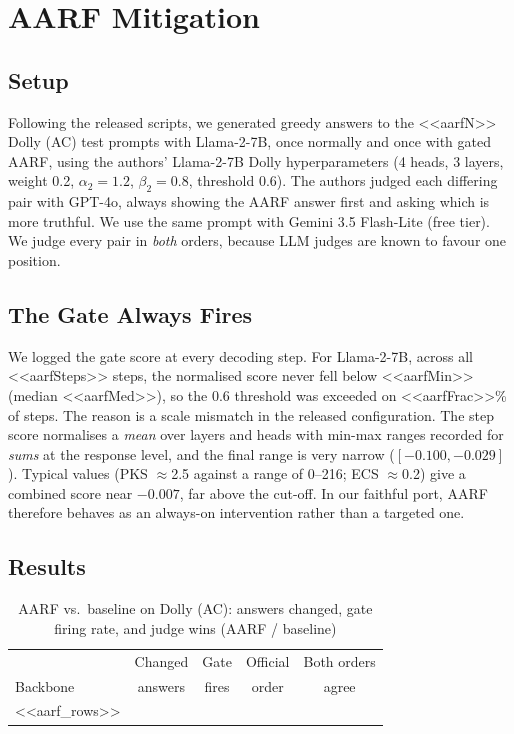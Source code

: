 \documentclass[conference]{IEEEtran}
\begin{document}
\section{AARF Mitigation}
\label{sec:aarf}
\subsection{Setup}
Following the released scripts, we generated greedy answers to the <<aarfN>> Dolly (AC) test prompts with Llama-2-7B, once normally and once with gated AARF, using the authors' Llama-2-7B Dolly hyperparameters (4 heads, 3 layers, weight 0.2, $\alpha_2=1.2$, $\beta_2=0.8$, threshold 0.6). The authors judged each differing pair with GPT-4o, always showing the AARF answer first and asking which is more truthful. We use the same prompt with Gemini 3.5 Flash-Lite (free tier). We judge every pair in \emph{both} orders, because LLM judges are known to favour one position.

\subsection{The Gate Always Fires}
We logged the gate score at every decoding step. For Llama-2-7B, across all <<aarfSteps>> steps, the normalised score never fell below <<aarfMin>> (median <<aarfMed>>), so the 0.6 threshold was exceeded on <<aarfFrac>>\% of steps. The reason is a scale mismatch in the released configuration. The step score normalises a \emph{mean} over layers and heads with min-max ranges recorded for \emph{sums} at the response level, and the final range is very narrow ($[-0.100, -0.029]$). Typical values (PKS $\approx$2.5 against a range of 0--216; ECS $\approx$0.2) give a combined score near $-0.007$, far above the cut-off. In our faithful port, AARF therefore behaves as an always-on intervention rather than a targeted one.

\subsection{Results}
\begin{table}[t]
\caption{AARF vs.\ baseline on Dolly (AC): answers changed, gate firing rate, and judge wins (AARF / baseline)}
\label{tab:aarf}
\centering\footnotesize
\setlength{\tabcolsep}{3pt}
\begin{tabular}{@{}lcccc@{}}
\toprule
& Changed & Gate & Official & Both orders \\
Backbone & answers & fires & order & agree \\
\midrule
<<aarf_rows>>
\bottomrule
\end{tabular}
\end{table}
\end{document}
